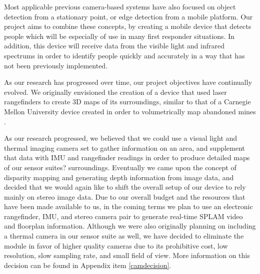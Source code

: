 Most applicable previous camera-based systems have also focused on object detection from a stationary point, or edge detection from a mobile platform. Our project aims to combine these concepts, by creating a mobile device that detects people which will be especially of use in many first responder situations. In addition, this device will receive data from the visible light and infrared spectrums in order to identify people quickly and accurately in a way that has not been previously implemented.
\par
As our research has progressed over time, our project objectives have continually evolved. We originally envisioned the creation of a device that used laser rangefinders to create 3D maps of its surroundings, similar to that of a Carnegie Mellon University device created in order to volumetrically map abandoned mines \cite{thrun}.
\par
As our research progressed, we believed that we could use a visual light and thermal imaging camera set to gather information on an area, and supplement that data with IMU and rangefinder readings in order to produce detailed maps of our sensor suites? surroundings. Eventually we came upon the concept of disparity mapping and generating depth information from image data, and decided that we would again like to shift the overall setup of our device to rely mainly on stereo image data. Due to our overall budget and the resources that have been made available to us, in the coming terms we plan to use an electronic rangefinder, IMU, and stereo camera pair to generate real-time SPLAM video and floorplan information. Although we were also originally planning on including a thermal camera in our sensor suite as well, we have decided to eliminate the module in favor of higher quality cameras due to its prohibitive cost, low resolution, slow sampling rate, and small field of view. More information on this decision can be found in Appendix item \ref{camdecision}.



